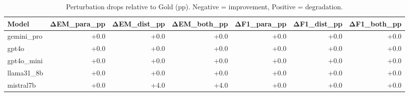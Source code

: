 \begin{table}[t]\centering
\caption{Perturbation drops relative to Gold (pp). Negative = improvement, Positive = degradation.}
\label{tab:drops}
\begin{tabular}{lrrrrrr}
\toprule
Model & ΔEM_para_pp & ΔEM_dist_pp & ΔEM_both_pp & ΔF1_para_pp & ΔF1_dist_pp & ΔF1_both_pp \\
\midrule
gemini_pro & +0.0 & +0.0 & +0.0 & +0.0 & +0.0 & +0.0 \\
gpt4o & +0.0 & +0.0 & +0.0 & +0.0 & +0.0 & +0.0 \\
gpt4o_mini & +0.0 & +0.0 & +0.0 & +0.0 & +0.0 & +0.0 \\
llama31_8b & +0.0 & +0.0 & +0.0 & +0.0 & +0.0 & +0.0 \\
mistral7b & +0.0 & +4.0 & +4.0 & +0.0 & +0.0 & +0.0 \\
\bottomrule
\end{tabular}
\end{table}
